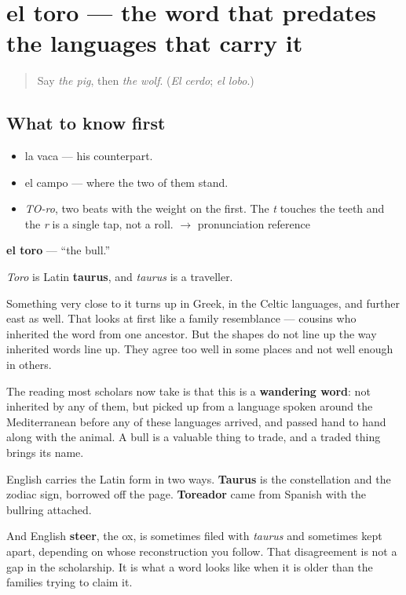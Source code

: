 \section[el toro]{el toro — the word that predates the languages that carry it}

\label{lesson:ES-C368-toro}



\begin{quote}
Say \emph{the pig}, then \emph{the wolf}. (\emph{El cerdo}; \emph{el lobo}.)
\end{quote}

\subsection*{What to know first}
\begin{itemize}
\raggedright
  \item la vaca — his counterpart.
  \item el campo — where the two of them stand.
\end{itemize}

\begin{sounds}
\begin{itemize}
\raggedright
  \item \emph{TO-ro}, two beats with the weight on the first. The \emph{t} touches the teeth and the \emph{r} is a single tap, not a roll. $\to$ pronunciation reference
\end{itemize}
\end{sounds}

\begin{cousinweb}
\textbf{el toro} — \textquotedblleft{}the bull.\textquotedblright{}

\emph{Toro} is Latin \textbf{taurus}, and \emph{taurus} is a traveller.

Something very close to it turns up in Greek, in the Celtic languages, and further east as well. That looks at first like a family resemblance — cousins who inherited the word from one ancestor. But the shapes do not line up the way inherited words line up. They agree too well in some places and not well enough in others.

The reading most scholars now take is that this is a \textbf{wandering word}: not inherited by any of them, but picked up from a language spoken around the Mediterranean before any of these languages arrived, and passed hand to hand along with the animal. A bull is a valuable thing to trade, and a traded thing brings its name.

English carries the Latin form in two ways. \textbf{Taurus} is the constellation and the zodiac sign, borrowed off the page. \textbf{Toreador} came from Spanish with the bullring attached.

And English \textbf{steer}, the ox, is sometimes filed with \emph{taurus} and sometimes kept apart, depending on whose reconstruction you follow. That disagreement is not a gap in the scholarship. It is what a word looks like when it is older than the families trying to claim it.
\end{cousinweb}

